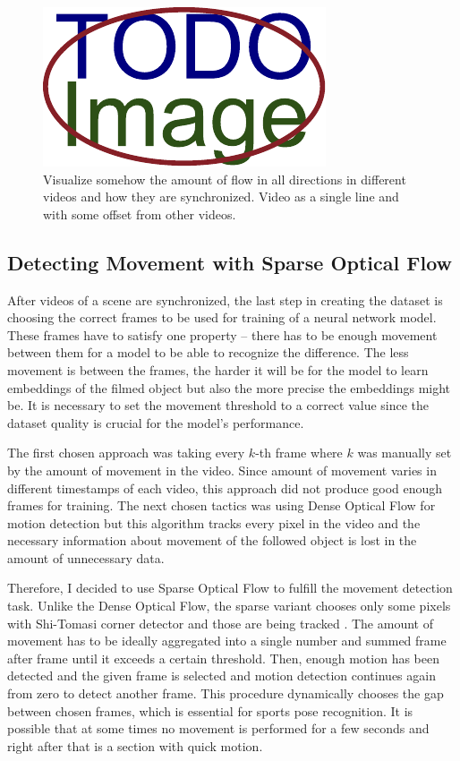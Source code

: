 \begin{figure}[ht]
    \centering
    \includegraphics{figures/placeholder.pdf}
    \caption{Visualize somehow the amount of flow in all directions in different videos and how they are synchronized. Video as a single line and with some offset from other videos.}
    \label{fig:video-synchronization}
\end{figure}

\subsection{Detecting Movement with Sparse Optical Flow}

After videos of a scene are synchronized, the last step in creating the dataset is choosing the correct frames to be used for training of a neural network model. These frames have to satisfy one property -- there has to be enough movement between them for a model to be able to recognize the difference. The less movement is between the frames, the harder it will be for the model to learn embeddings of the filmed object but also the more precise the embeddings might be. It is necessary to set the movement threshold to a correct value since the dataset quality is crucial for the model's performance.

The first chosen approach was taking every $k$-th frame where $k$ was manually set by the amount of movement in the video. Since amount of movement varies in different timestamps of each video, this approach did not produce good enough frames for training. The next chosen tactics was using Dense Optical Flow for motion detection but this algorithm tracks every pixel in the video and the necessary information about movement of the followed object is lost in the amount of unnecessary data.

Therefore, I decided to use Sparse Optical Flow to fulfill the movement detection task. Unlike the Dense Optical Flow, the sparse variant chooses only some pixels with Shi-Tomasi corner detector and those are being tracked \cite{shi-tomasi-323794}. The amount of movement has to be ideally aggregated into a single number and summed frame after frame until it exceeds a certain threshold. Then, enough motion has been detected and the given frame is selected and motion detection continues again from zero to detect another frame. This procedure dynamically chooses the gap between chosen frames, which is essential for sports pose recognition. It is possible that at some times no movement is performed for a few seconds and right after that is a section with quick motion.

